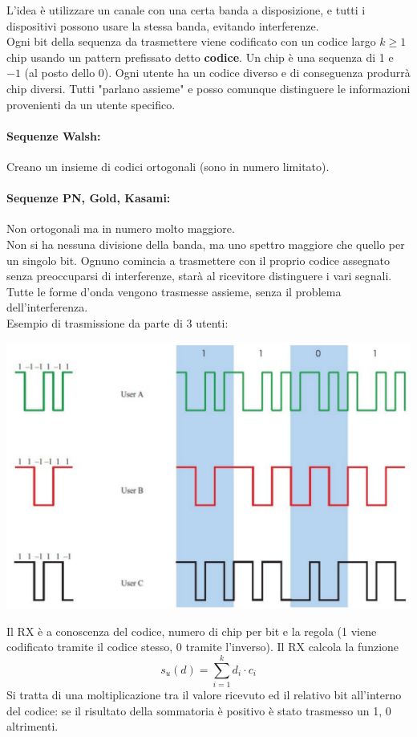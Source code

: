 L'idea è utilizzare un canale con una certa banda a disposizione, e tutti i dispositivi possono usare la stessa banda, evitando interferenze.\\

Ogni bit della sequenza da trasmettere viene codificato con un codice largo $k \geq 1$ chip usando un pattern prefissato detto \textbf{codice}. Un chip è una sequenza di 1 e $-1$ (al posto dello $0$). Ogni utente ha un codice diverso e di conseguenza produrrà chip diversi. Tutti "parlano assieme" e posso comunque distinguere le informazioni provenienti da un utente specifico.

\paragraph{Sequenze Walsh:} Creano un insieme di codici ortogonali (sono in numero limitato).

\paragraph{Sequenze PN, Gold, Kasami:} Non ortogonali ma in numero molto maggiore.\\

Non si ha nessuna divisione della banda, ma uno spettro maggiore che quello per un singolo bit. Ognuno comincia a trasmettere con il proprio codice assegnato senza preoccuparsi di interferenze, starà al ricevitore distinguere i vari segnali. Tutte le forme d'onda vengono trasmesse assieme, senza il problema dell'interferenza.\\
Esempio di trasmissione da parte di 3 utenti:
\begin{center}
	\includegraphics[width=0.6\linewidth]{img/wireless/CDMA1}
\end{center}

Il RX è a conoscenza del codice, numero di chip per bit e la regola (1 viene codificato tramite il codice stesso, 0 tramite l'inverso). Il RX calcola la funzione
$$ s_u (d) = \sum_{i=1}^{k} d_i \cdot c_i $$ 
Si tratta di una moltiplicazione tra il valore ricevuto ed il relativo bit all'interno del codice: se il risultato della sommatoria è positivo è stato trasmesso un 1, 0 altrimenti.\\

